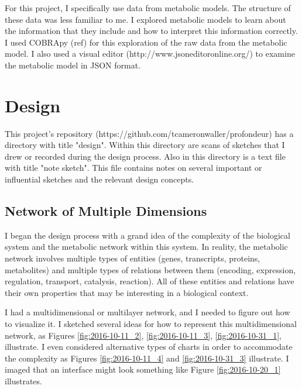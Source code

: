For this project, I specifically use data from metabolic models.
The structure of these data was less familiar to me.
I explored metabolic models to learn about the information that they include and how to interpret this information correctly.
I used COBRApy (ref) for this exploration of the raw data from the metabolic model.
I also used a visual editor (http://www.jsoneditoronline.org/) to examine the metabolic model in JSON format.

\section{Design}


This project's repository (https://github.com/tcameronwaller/profondeur) has a directory with title "design".
Within this directory are scans of sketches that I drew or recorded during the design process.
Also in this directory is a text file with title "note sketch".
This file contains notes on several important or influential sketches and the relevant design concepts.

\subsection{Network of Multiple Dimensions}

I began the design process with a grand idea of the complexity of the biological system and the metabolic network within this system.
In reality, the metabolic network involves multiple types of entities (genes, transcripts, proteins, metabolites) and multiple types of relations between them (encoding, expression, regulation, transport, catalysis, reaction).
All of these entities and relations have their own properties that may be interesting in a biological context.

I had a multidimensional or multilayer network, and I needed to figure out how to visualize it.
I sketched several ideas for how to represent this multidimensional network, as Figures \ref{fig:2016-10-11_2}, \ref{fig:2016-10-11_3}, \ref{fig:2016-10-31_1}, illustrate.
I even considered alternative types of charts in order to accommodate the complexity as Figures \ref{fig:2016-10-11_4} and \ref{fig:2016-10-31_3} illustrate.
I imaged that an interface might look something like Figure \ref{fig:2016-10-20_1} illustrates.

